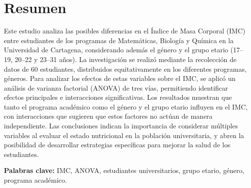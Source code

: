 \documentclass{rapport}
\begin{document}

\subject{Diseño de Experimentos} %



        
\buildmargins %
\buildcover %
\tableofcontents %
\newpage

\section*{Resumen}
Este estudio analiza las posibles diferencias en el Índice de Masa Corporal (IMC) entre estudiantes de los programas de Matemáticas, Biología y Química en la Universidad de Cartagena, considerando además el género y el grupo etario (17–19, 20–22 y 23–31 años). La investigación se realizó mediante la recolección de datos de 60 estudiantes, distribuidos equitativamente en los diferentes programas, géneros. Para analizar los efectos de estas variables sobre el IMC, se aplicó un análisis de varianza factorial (ANOVA) de tres vías, permitiendo identificar efectos principales e interacciones significativas. Los resultados muestran que tanto el programa académico como el género y el grupo etario influyen en el IMC, con interacciones que sugieren que estos factores no actúan de manera independiente. Las conclusiones indican la importancia de considerar múltiples variables al evaluar el estado nutricional en la población universitaria, y abren la posibilidad de desarrollar estrategias específicas para mejorar la salud de los estudiantes.

\vspace{0.5cm}

\textbf{Palabras clave:} IMC, ANOVA, estudiantes universitarios, grupo etario, género, programa académico. 



\newpage
\end{document}
